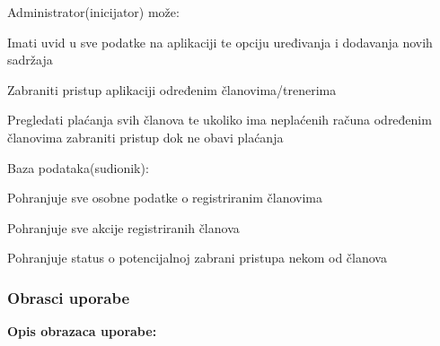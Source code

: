 \documentclass{article}
\begin{document}
\begin{packed_enum}
			\item Administrator(inicijator) može:
			\begin{packed_enum}
				\item Imati uvid u sve podatke na aplikaciji te opciju uređivanja i dodavanja novih sadržaja
				\item Zabraniti pristup aplikaciji određenim članovima/trenerima 
				\item Pregledati plaćanja svih članova te ukoliko ima neplaćenih računa određenim članovima zabraniti pristup dok ne obavi plaćanja
			\end{packed_enum}
			\item Baza podataka(sudionik):
			\begin{packed_enum}
				\item Pohranjuje sve osobne podatke o registriranim članovima
				\item Pohranjuje sve akcije registriranih članova
				\item Pohranjuje status o potencijalnoj zabrani pristupa nekom od članova
			\end{packed_enum}
		\end{packed_enum}
		\eject
		
		\subsubsection{Obrasci uporabe}
		\noindent \textbf{Opis obrazaca uporabe:}\\
		
\end{document}
